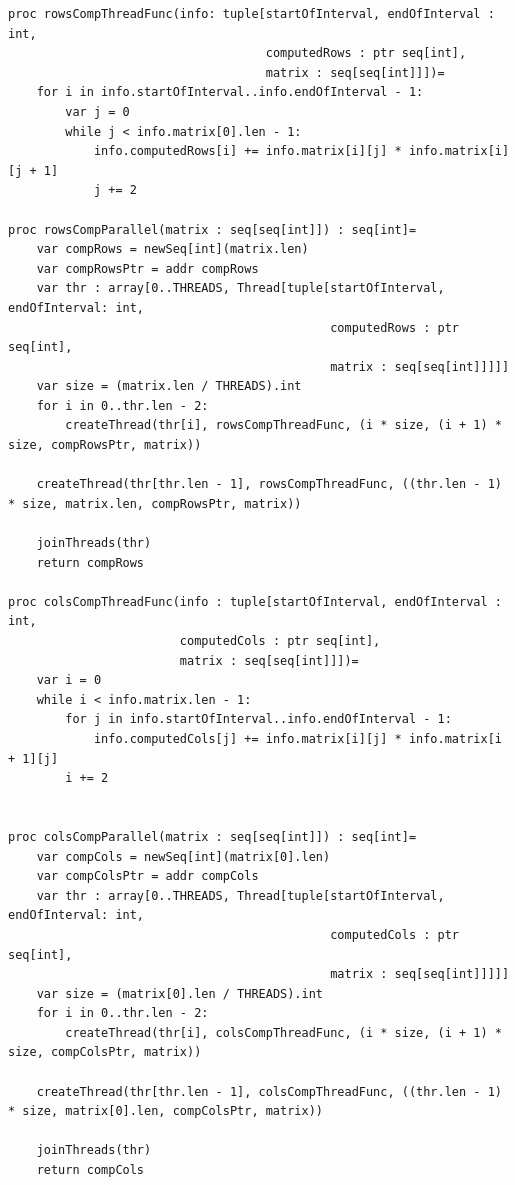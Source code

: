 \documentclass[12pt]{report}
\begin{document}
\begin{lstlisting}[caption=Реализация первой схемы параллельного алгоритма Копперсмита-Винограда,
label={list:paral}]
proc rowsCompThreadFunc(info: tuple[startOfInterval, endOfInterval : int,
                                    computedRows : ptr seq[int],
                                    matrix : seq[seq[int]]])=
    for i in info.startOfInterval..info.endOfInterval - 1:
        var j = 0
        while j < info.matrix[0].len - 1:
            info.computedRows[i] += info.matrix[i][j] * info.matrix[i][j + 1]
            j += 2

proc rowsCompParallel(matrix : seq[seq[int]]) : seq[int]=
    var compRows = newSeq[int](matrix.len)
    var compRowsPtr = addr compRows
    var thr : array[0..THREADS, Thread[tuple[startOfInterval, endOfInterval: int,
                                             computedRows : ptr seq[int],
                                             matrix : seq[seq[int]]]]]
    var size = (matrix.len / THREADS).int
    for i in 0..thr.len - 2:
        createThread(thr[i], rowsCompThreadFunc, (i * size, (i + 1) * size, compRowsPtr, matrix))

    createThread(thr[thr.len - 1], rowsCompThreadFunc, ((thr.len - 1) * size, matrix.len, compRowsPtr, matrix))

    joinThreads(thr)
    return compRows

proc colsCompThreadFunc(info : tuple[startOfInterval, endOfInterval : int,
                        computedCols : ptr seq[int],
                        matrix : seq[seq[int]]])=
    var i = 0
    while i < info.matrix.len - 1:
        for j in info.startOfInterval..info.endOfInterval - 1:
            info.computedCols[j] += info.matrix[i][j] * info.matrix[i + 1][j]
        i += 2


proc colsCompParallel(matrix : seq[seq[int]]) : seq[int]=
    var compCols = newSeq[int](matrix[0].len)
    var compColsPtr = addr compCols
    var thr : array[0..THREADS, Thread[tuple[startOfInterval, endOfInterval: int,
                                             computedCols : ptr seq[int],
                                             matrix : seq[seq[int]]]]]
    var size = (matrix[0].len / THREADS).int
    for i in 0..thr.len - 2:
        createThread(thr[i], colsCompThreadFunc, (i * size, (i + 1) * size, compColsPtr, matrix))

    createThread(thr[thr.len - 1], colsCompThreadFunc, ((thr.len - 1) * size, matrix[0].len, compColsPtr, matrix))

    joinThreads(thr)
    return compCols



\end{lstlisting}
\end{document}

